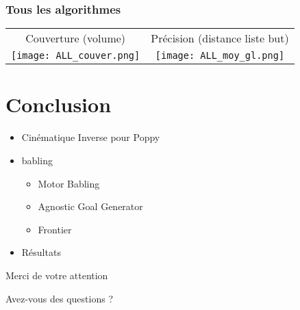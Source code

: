 \documentclass[french]{beamer}
\begin{document}

\begin{frame}
    \frametitle{Tous les algorithmes}
    \begin{tabular}{c c}
        Couverture (volume) & Précision (distance liste but)
        \\
        \texttt{[image: ALL\_couver.png]} &
        \texttt{[image: ALL\_moy\_gl.png]}
    \end{tabular}
\end{frame}

\section{Conclusion}

\begin{frame}



    \begin{itemize}
        \item Cinématique Inverse pour Poppy
        \item babling
        \begin{itemize}
            \item Motor Babling
            \item Agnostic Goal Generator
            \item Frontier
        \end{itemize}
        \item Résultats
    \end{itemize}

\end{frame}

\begin{frame}
    \center
    \Huge Merci de votre attention
    
    Avez-vous des questions ?
\end{frame}
\end{document}
